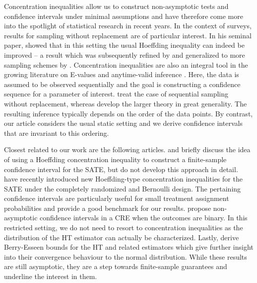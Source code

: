 \documentclass[aos]{imsart2}
\theoremstyle{plain}
\theoremstyle{definition}
\begin{document}
Concentration inequalities allow us to construct non-asymptotic tests and confidence intervals under minimal assumptions and have therefore come more into the spotlight of statistical research in recent years. In the context of surveys, results for sampling without replacement are of particular interest. In his seminal paper, \citet{serfling_probability_1974} showed that in this setting the usual Hoeffding inequality can indeed be improved -- a result which was subsequently refined by \citet{bardenet_concentration_2015} and generalized to more sampling schemes by \citet{bertail_bernstein-type_2019}. Concentration inequalities are also an integral tool in the growing literature on E-values and anytime-valid inference \citep{ramdas_game-theoretic_2023}. Here, the data is assumed to be observed sequentially and the goal is constructing a confidence sequence for a parameter of interest. \citet{waudby-smith_confidence_2020} treat the case of sequential sampling without replacement, whereas \citet{howard_time-uniform_2021} develop the larger theory in great generality. The resulting inference typically depends on the order of the data points. By contrast, our article considers the usual static setting and we derive confidence intervals that are invariant to this ordering.

Closest related to our work are the following articles. \citet{aronow_nonparametric_2025} and \citet{ding_what_2025} briefly discuss the idea of using a Hoeffding concentration inequality to construct a finite-sample confidence interval for the SATE, but do not develop this approach in detail. \citet{sandoval_nonasymptotic_2026} have recently introduced new Hoeffding-type concentration inequalities for the SATE under the completely randomized and Bernoulli design. The pertaining confidence intervals are particularly useful for small treatment assignment probabilities and provide a good benchmark for our results. \citet{li_exact_2016} propose non-asymptotic confidence intervals in a CRE when the outcomes are binary. In this restricted setting, we do not need to resort to concentration inequalities as the distribution of the HT estimator can actually be characterized. Lastly, \citet{shi_berryesseen_2026} derive Berry-Esseen bounds for the HT and related estimators which give further insight into their convergence behaviour to the normal distribution. While these results are still asymptotic, they are a step towards finite-sample guarantees and underline the interest in them.
\end{document}
